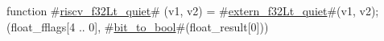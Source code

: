 function #\hyperref[sailRISCVzriscvzyf32Ltzyquiet]{riscv\_f32Lt\_quiet}# (v1, v2) = {
  #\hyperref[sailRISCVzexternzyf32Ltzyquiet]{extern\_f32Lt\_quiet}#(v1, v2);
  (float_fflags[4 .. 0], #\hyperref[sailRISCVzbitzytozybool]{bit\_to\_bool}#(float_result[0]))
}

